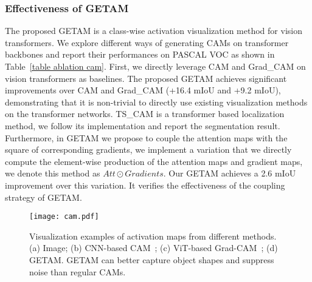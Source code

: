 \documentclass[10pt,twocolumn,letterpaper]{article}
\begin{document}
\subsubsection{Effectiveness of GETAM}
The proposed GETAM is a class-wise activation visualization method for vision transformers.
We explore different ways of generating CAMs on transformer backbones and report their performances on PASCAL VOC
as shown in Table~\ref{table ablation cam}.
First, we directly leverage CAM \cite {zhou2016learning} and Grad\_CAM \cite{selvaraju2016grad} on vision transformers as baselines.
The proposed GETAM achieves significant improvements over CAM and Grad\_CAM (+16.4 mIoU and +9.2 mIoU), demonstrating that it is non-trivial to directly use existing visualization methods on the transformer networks.
TS\_CAM \cite{gao2021tscam} is a transformer based localization method, we follow its implementation and report the segmentation result.
Furthermore, in GETAM we propose to couple the attention maps with the square of corresponding gradients, 
we implement a variation that we directly compute the element-wise production of the attention maps and gradient maps, we denote this method as  
$Att \odot Gradients$.
Our GETAM achieves a 2.6 mIoU improvement over this variation. It verifies the effectiveness of the coupling strategy of GETAM.



\begin{figure}[htb]
\begin{center}
   {\texttt{[image: cam.pdf]}} 
   \end{center}
\caption{Visualization examples of activation maps from different methods. (a) Image; (b) CNN-based CAM~\cite{zhou2016learning}; (c) ViT-based Grad-CAM~\cite{selvaraju2016grad};  (d) GETAM. GETAM can
better capture object shapes and suppress noise than regular CAMs.}
\label{fig:cam}
\end{figure}
\end{document}
